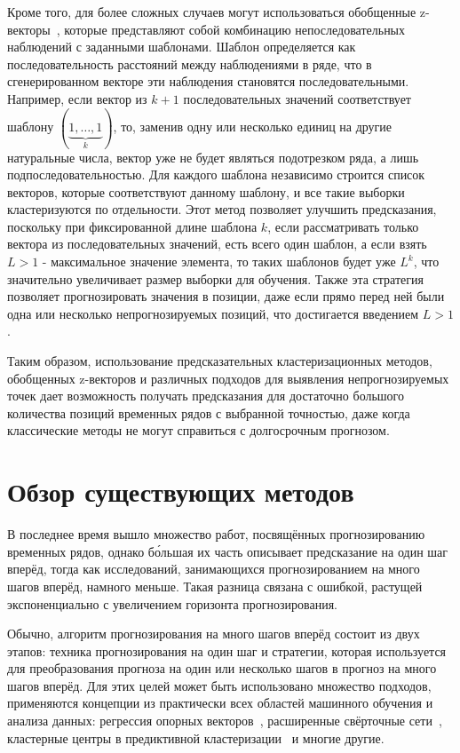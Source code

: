\documentclass[a4paper, 12pt]{extarticle}
\begin{document}
Кроме того, для более сложных случаев могут использоваться обобщенные z-векторы~\cite{Small05}, которые представляют собой комбинацию непоследовательных наблюдений с заданными шаблонами. Шаблон определяется как последовательность расстояний между наблюдениями в ряде, что в сгенерированном векторе эти наблюдения становятся последовательными. Например, если вектор из $k+1$ последовательных значений соответствует шаблону $(\underbrace{1,\ldots,1}_{k})$, то, заменив одну или несколько единиц на другие натуральные числа, вектор уже не будет являться подотрезком ряда, а лишь подпоследовательностью. Для каждого шаблона независимо строится список векторов, которые соответствуют данному шаблону, и все такие выборки кластеризуются по отдельности. Этот метод позволяет улучшить предсказания, поскольку при фиксированной длине шаблона $k$, если рассматривать только вектора из последовательных значений, есть всего один шаблон, а если взять $L>1$ - максимальное значение элемента, то таких шаблонов будет уже $L^k$, что значительно увеличивает размер выборки для обучения. Также эта стратегия позволяет прогнозировать значения в позиции, даже если прямо перед ней были одна или несколько непрогнозируемых позиций, что достигается введением $L>1$.

Таким образом, использование предсказательных кластеризационных методов, обобщенных z-векторов и различных подходов для выявления непрогнозируемых точек дает возможность получать предсказания для достаточно большого количества позиций временных рядов с выбранной точностью, даже когда классические методы не могут справиться с долгосрочным прогнозом.

\section{Обзор существующих методов}
В последнее время вышло множество работ, посвящённых прогнозированию временных рядов, однако б\'{о}льшая их часть описывает предсказание на один шаг вперёд, тогда как исследований, занимающихся прогнозированием на много шагов вперёд, намного меньше. Такая разница связана с ошибкой, растущей экспоненциально с увеличением горизонта прогнозирования.

Обычно, алгоритм прогнозирования на много шагов вперёд состоит из двух этапов: техника прогнозирования на один шаг и стратегии, которая используется для преобразования прогноза на один или несколько шагов в прогноз на много шагов вперёд. Для этих целей может быть использовано множество подходов, применяются концепции из практически всех областей машинного обучения и анализа данных: регрессия опорных векторов~\cite{Bao14}, расширенные свёрточные сети~\cite{Wang20}, кластерные центры в предиктивной кластеризации~\cite{Gromov17} и многие другие.
\end{document}
